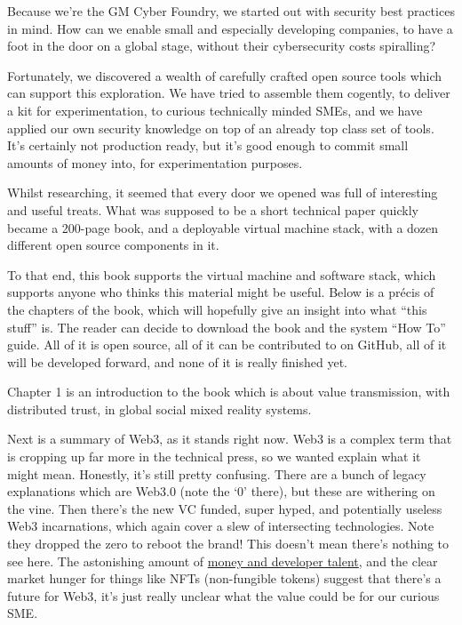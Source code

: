 Because we’re the GM Cyber Foundry, we started out with security best practices in mind. How can we enable small and especially developing companies, to have a foot in the door on a global stage, without their cybersecurity costs spiralling? \par
Fortunately, we discovered a wealth of carefully crafted open source tools which can support this exploration. We have tried to assemble them cogently, to deliver a kit for experimentation, to curious technically minded SMEs, and we have applied our own security knowledge on top of an already top class set of tools. It’s certainly not production ready, but it's good enough to commit small amounts of money into, for experimentation purposes.\par
Whilst researching, it seemed that every door we opened was full of interesting and useful treats. What was supposed to be a short technical paper quickly became a 200-page book, and a deployable virtual machine stack, with a dozen different open source components in it. \par
To that end, this book supports the virtual machine and software stack, which supports anyone who thinks this material might be useful. Below is a précis of the chapters of the book, which will hopefully give an insight into what ``this stuff'' is. The reader can decide to download the book and the system ``How To'' guide. All of it is open source, all of it can be contributed to on GitHub, all of it will be developed forward, and none of it is really finished yet.\par
Chapter 1 is an introduction to the book which is about value transmission, with distributed trust, in global social mixed reality systems. \par
Next is a summary of Web3, as it stands right now. Web3 is a complex term that is cropping up far more in the technical press, so we wanted explain what it might mean. Honestly, it’s still pretty confusing. There are a bunch of legacy explanations which are Web3.0 (note the `0' there), but these are withering on the vine. Then there’s the new VC funded, super hyped, and potentially useless Web3 incarnations, which again cover a slew of intersecting technologies. Note they dropped the zero to reboot the brand! This doesn’t mean there’s nothing to see here. The astonishing amount of \href{https://mirror.xyz/tr3butor.eth/AlZPMq_syymAoi8M1VVb2xES9Twj1OeetJbEE7EWhiw}{money and developer talent}, and the clear market hunger for things like NFTs (non-fungible tokens) suggest that there’s a future for Web3, it’s just really unclear what the value could be for our curious SME.\par
